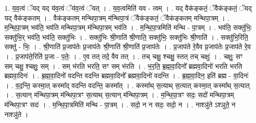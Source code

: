 \documentclass[17pt]{extarticle}
\begin{document}
1. य॒व॒त्वं ॅयद् यद् य॑व॒त्वं ॅय॑व॒त्वं ॅयत् । . य॒व॒त्वमिति॑ यव - त्वम् । . यद् वैक॑ङ्कतं॒ ॅवैक॑ङ्कतं॒ ॅयद् यद् वैक॑ङ्कतम् । . वैक॑ङ्कतम् मन्थिपा॒त्रम् म॑न्थिपा॒त्रं ॅवैक॑ङ्कतं॒ ॅवैक॑ङ्कतम् मन्थिपा॒त्रम् । . म॒न्थि॒पा॒त्रम् भव॑ति॒ भव॑ति मन्थिपा॒त्रम् म॑न्थिपा॒त्रम् भव॑ति । . म॒न्थि॒पा॒त्रमिति॑ मन्थि - पा॒त्रम् । . भव॑ति॒ सक्तु॑भिः॒ सक्तु॑भि॒र् भव॑ति॒ भव॑ति॒ सक्तु॑भिः । . सक्तु॑भिः श्री॒णाति॑ श्री॒णाति॒ सक्तु॑भिः॒ सक्तु॑भिः श्री॒णाति॑ । . सक्तु॑भि॒रिति॒ सक्तु॑ - भिः॒ । . श्री॒णाति॑ प्र॒जाप॑तेः प्र॒जाप॑तेः श्री॒णाति॑ श्री॒णाति॑ प्र॒जाप॑तेः । . प्र॒जाप॑ते रे॒वैव प्र॒जाप॑तेः प्र॒जाप॑ते रे॒व । . प्र॒जाप॑ते॒रिति॑ प्र॒जा - प॒तेः॒ । . ए॒व तत् तदे॒ वैव तत् । . तच् चक्षु॒ श्चक्षु॒ स्तत् तच् चक्षुः॑ । . चक्षुः॒ सꣳ सम् चक्षु॒ श्चक्षुः॒ सम् । . सम् भ॑रति भरति॒ सꣳ सम् भ॑रति । . भ॒र॒ति॒ ब्र॒ह्म॒वा॒दिनो᳚ ब्रह्मवा॒दिनो॑ भरति भरति ब्रह्मवा॒दिनः॑ । . ब्र॒ह्म॒वा॒दिनो॑ वदन्ति वदन्ति ब्रह्मवा॒दिनो᳚ ब्रह्मवा॒दिनो॑ वदन्ति । . ब्र॒ह्म॒वा॒दिन॒ इति॑ ब्रह्म - वा॒दिनः॑ । . व॒द॒न्ति॒ कस्मा॒त् कस्मा᳚द् वदन्ति वदन्ति॒ कस्मा᳚त् । . कस्मा᳚थ् स॒त्याथ् स॒त्यात् कस्मा॒त् कस्मा᳚थ् स॒त्यात् । . स॒त्यान् म॑न्थिपा॒त्रम् म॑न्थिपा॒त्रꣳ स॒त्याथ् स॒त्यान् म॑न्थिपा॒त्रम् । . म॒न्थि॒पा॒त्रꣳ सदः॒ सदो॑ मन्थिपा॒त्रम् म॑न्थिपा॒त्रꣳ सदः॑ । . म॒न्थि॒पा॒त्रमिति॑ मन्थि - पा॒त्रम् । . सदो॒ न न सदः॒ सदो॒ न । . नाश्ञु॑ते ऽश्ञुते॒ न नाश्ञु॑ते । \newline
\end{document}
